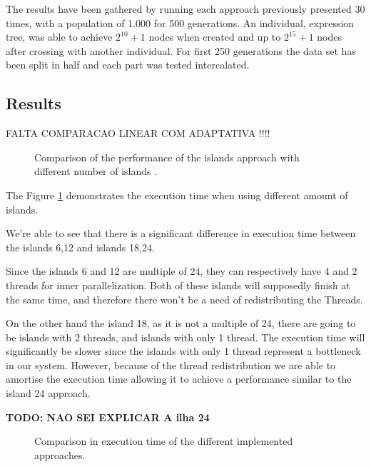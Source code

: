 \documentclass[runningheads]{llncs}
\begin{document}
The results have been gathered by running each approach previously presented 30 times, with a population of 1.000 for 500 generations. An individual, expression tree, was able to achieve \(2^{10} + 1\) nodes when created and up to \(2^{15} + 1\) nodes after crossing with another individual. For first 250 generations the data set has been split in half and each part was tested intercalated.

\subsection{Results}

FALTA COMPARACAO LINEAR COM ADAPTATIVA !!!!

\begin{figure}[H]
\centering
{}
\caption{Comparison of the performance of the islands approach with different number of islands .} \label{comparacaoilhas}
\end{figure}

The Figure \ref{comparacaoilhas} demonstrates the execution time when using different amount of islands.

We're able to see that there is a significant difference in execution time between the islands 6,12 and islands 18,24. 

Since the islands 6 and 12 are multiple of 24, they can respectively have 4 and 2 threads for inner parallelization. Both of these islands will supposedly finish at the same time, and therefore there won't be a need of redistributing the Threads.

On the other hand the island 18, as it is not a multiple of 24, there are going to be islands with 2 threads, and islands with only 1 thread. The execution time will significantly be slower since the islands with only 1 thread represent a bottleneck in our system. However, because of the thread redistribution we are able to amortise the execution time allowing it to achieve a performance similar to the island 24 approach.

\textbf{TODO: NAO SEI EXPLICAR A ilha 24}

\begin{figure}[H]
\centering

%
\qquad
{}%
\caption{Comparison in execution time of the different implemented approaches.} \label{comparacaolinear}
\label{comparacaoImpl}%
\end{figure}
\end{document}
